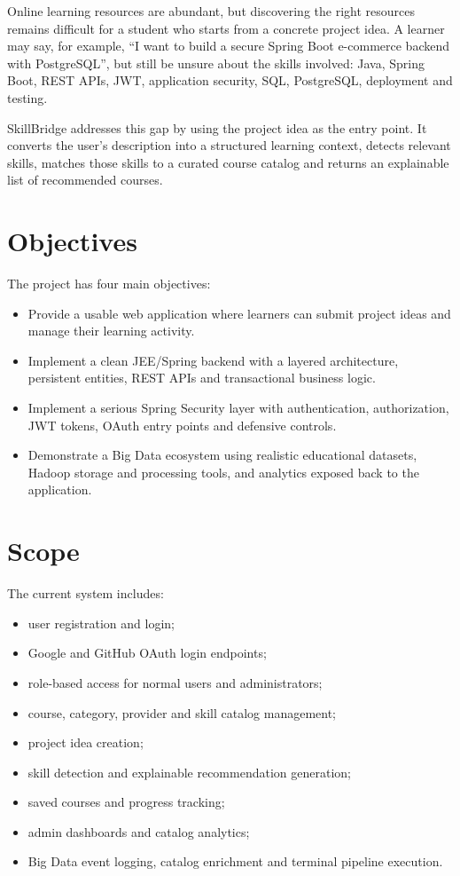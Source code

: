 \documentclass[12pt,a4paper]{report}
\newcommand{\projectName}{SkillBridge}
\begin{document}
Online learning resources are abundant, but discovering the right resources remains difficult for a student who starts from a concrete project idea. A learner may say, for example, ``I want to build a secure Spring Boot e-commerce backend with PostgreSQL'', but still be unsure about the skills involved: Java, Spring Boot, REST APIs, JWT, application security, SQL, PostgreSQL, deployment and testing.

\projectName{} addresses this gap by using the project idea as the entry point. It converts the user's description into a structured learning context, detects relevant skills, matches those skills to a curated course catalog and returns an explainable list of recommended courses.

\section{Objectives}
The project has four main objectives:

\begin{itemize}[leftmargin=*]
    \item Provide a usable web application where learners can submit project ideas and manage their learning activity.
    \item Implement a clean JEE/Spring backend with a layered architecture, persistent entities, REST APIs and transactional business logic.
    \item Implement a serious Spring Security layer with authentication, authorization, JWT tokens, OAuth entry points and defensive controls.
    \item Demonstrate a Big Data ecosystem using realistic educational datasets, Hadoop storage and processing tools, and analytics exposed back to the application.
\end{itemize}

\section{Scope}
The current system includes:

\begin{itemize}[leftmargin=*]
    \item user registration and login;
    \item Google and GitHub OAuth login endpoints;
    \item role-based access for normal users and administrators;
    \item course, category, provider and skill catalog management;
    \item project idea creation;
    \item skill detection and explainable recommendation generation;
    \item saved courses and progress tracking;
    \item admin dashboards and catalog analytics;
    \item Big Data event logging, catalog enrichment and terminal pipeline execution.
\end{itemize}
\end{document}
